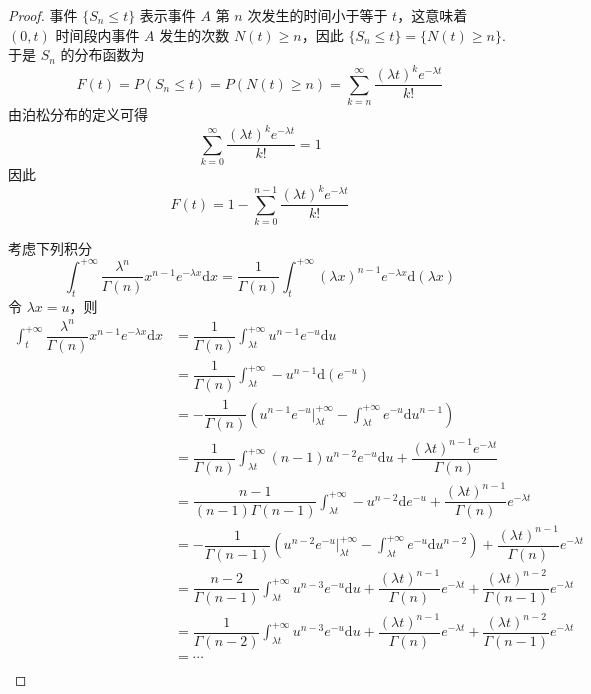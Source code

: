 \begin{proof}
    事件 $\{ S_n \leqslant t \}$ 表示事件 $A$ 第 $n$ 次发生的时间小于等于 $t$，这意味着 $(0,t)$ 时间段内事件 $A$ 发生的次数 $N(t) \geqslant n$，因此 $\{ S_n \leqslant t \} = \{ N(t) \geqslant n \}$.于是 $S_n$ 的分布函数为
    $$
    F(t) = P(S_n \leqslant t) = P(N(t) \geqslant n) = \sum_{k=n}^{\infty} \dfrac{(\lambda t)^k e^{-\lambda t}}{k!}
    $$
    由泊松分布的定义可得
    $$
    \sum_{k=0}^{\infty} \dfrac{(\lambda t)^k e^{-\lambda t}}{k!} = 1
    $$
    因此
    $$
    F(t) = 1 - \sum_{k=0}^{n-1} \dfrac{(\lambda t)^k e^{-\lambda t}}{k!}
    $$

    考虑下列积分
    $$
    \int_{t}^{+\infty} \dfrac{\lambda^n}{\Gamma(n)} x^{n-1} e^{-\lambda x} \text{d}x = \dfrac{1}{\Gamma(n)} \int_{t}^{+\infty} (\lambda x)^{n-1} e^{-\lambda x} \text{d}(\lambda x)
    $$
    令 $\lambda x = u$，则
    $$
    \begin{aligned}
        \int_{t}^{+\infty} \dfrac{\lambda^n}{\Gamma(n)} x^{n-1} e^{-\lambda x} \text{d}x &= \dfrac{1}{\Gamma(n)} \int_{\lambda t}^{+\infty} u^{n-1} e^{-u} \text{d}u \\
        &= \dfrac{1}{\Gamma(n)} \int_{\lambda t}^{+\infty} -u^{n-1} \text{d}(e^{-u}) \\
        &= -\dfrac{1}{\Gamma(n)} \left( u^{n-1} e^{-u} \Big|_{\lambda t}^{+\infty} - \int_{\lambda t}^{+\infty} e^{-u} \text{d} u^{n-1} \right) \\
        &= \dfrac{1}{\Gamma(n)} \int_{\lambda t}^{+\infty} (n-1) u^{n-2} e^{-u} \text{d}u + \dfrac{(\lambda t)^{n-1} e^{-\lambda t}}{\Gamma(n)} \\
        &= \dfrac{n-1}{(n-1) \Gamma(n-1)} \int_{\lambda t}^{+\infty} -u^{n-2} \text{d} e^{-u} + \dfrac{(\lambda t)^{n-1}}{\Gamma(n)} e^{-\lambda t} \\
        &= -\dfrac{1}{\Gamma(n-1)} \left( u^{n-2} e^{-u} \Big|_{\lambda t}^{+\infty} - \int_{\lambda t}^{+\infty} e^{-u} \text{d} u^{n-2} \right) + \dfrac{(\lambda t)^{n-1}}{\Gamma(n)} e^{-\lambda t} \\
        &= \dfrac{n-2}{\Gamma(n-1)} \int_{\lambda t}^{+\infty} u^{n-3} e^{-u} \text{d}u + \dfrac{(\lambda t)^{n-1}}{\Gamma(n)} e^{-\lambda t} + \dfrac{(\lambda t)^{n-2}}{\Gamma(n-1)} e^{-\lambda t} \\
        &= \dfrac{1}{\Gamma(n-2)} \int_{\lambda t}^{+\infty} u^{n-3} e^{-u} \text{d}u + \dfrac{(\lambda t)^{n-1}}{\Gamma(n)} e^{-\lambda t} + \dfrac{(\lambda t)^{n-2}}{\Gamma(n-1)} e^{-\lambda t} \\
        &= \cdots \\

\end{aligned}$$
\end{proof}
